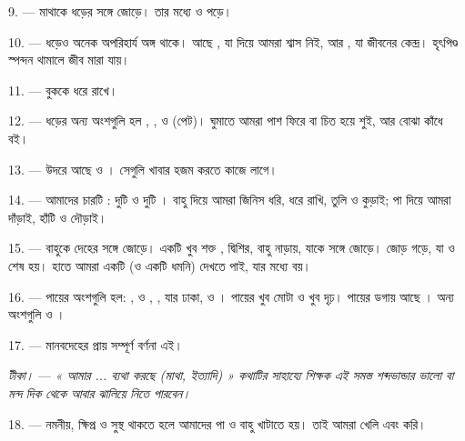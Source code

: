 9. ---  মাথাকে ধড়ের সঙ্গে জোড়ে। তার মধ্যে  ও
 পড়ে।

10. --- ধড়েও অনেক অপরিহার্য অঙ্গ থাকে।  আছে ,
যা দিয়ে আমরা শ্বাস নিই, আর , যা জীবনের কেন্দ্র।
হৃৎপিণ্ড স্পন্দন থামালে জীব মারা যায়।

11. ---  বুককে ধরে রাখে।

12. --- ধড়ের অন্য অংশগুলি হল , ,
 ও  (পেট)। ঘুমাতে আমরা পাশ ফিরে বা চিত হয়ে শুই,
আর বোঝা কাঁধে বই।

13. --- উদরে আছে  ও । সেগুলি খাবার হজম
করতে কাজে লাগে।

\VUsaut{4.4mm}
\VUsaut{3.0mm}

14. --- আমাদের চারটি : দুটি  ও দুটি ।
বাহু দিয়ে আমরা জিনিস ধরি, ধরে রাখি, তুলি ও কুড়াই; পা দিয়ে আমরা দাঁড়াই,
হাঁটি ও দৌড়াই।

15. ---  বাহুকে দেহের সঙ্গে জোড়ে। একটি খুব শক্ত
, দ্বিশির, বাহু নাড়ায়, যাকে 
 সঙ্গে জোড়ে।  
জোড় গড়ে, যা  ও  শেষ হয়। হাতে আমরা একটি
 (ও একটি ধমনি) দেখতে পাই, যার মধ্যে  বয়।

16. --- পায়ের অংশগুলি হল: ,  ও
, , যার  
ঢাকা,  ও । পায়ের  খুব মোটা ও
খুব দৃঢ়। পায়ের ডগায় আছে । অন্য অংশগুলি
 ও ।

17. --- মানবদেহের প্রায় সম্পূর্ণ বর্ণনা এই।

\textit{টীকা।} --- \textit{« আমার ... ব্যথা করছে (মাথা, ইত্যাদি) » কথাটির
সাহায্যে শিক্ষক এই সমস্ত শব্দভান্ডার ভালো বা মন্দ}  \textit{দিক থেকে আবার ঝালিয়ে নিতে পারবেন।}

\VUsaut{5.0mm}
\VUsaut{2.4mm}
\VUsaut{3.0mm}

18. --- নমনীয়, ক্ষিপ্র ও সুস্থ থাকতে হলে আমাদের পা ও বাহু খাটাতে হয়।
তাই আমরা খেলি এবং  করি।

